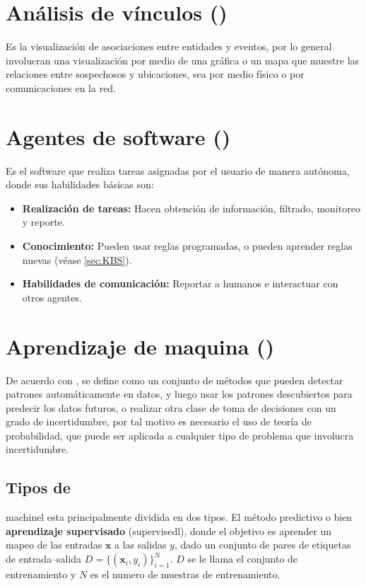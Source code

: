 
\section{Análisis de vínculos ()}
Es la visualización de asociaciones entre entidades y eventos, por lo general involucran una visualización por medio de una gráfica o un mapa que muestre las relaciones entre sospechosos y ubicaciones, sea por medio físico o por comunicaciones en la red.


\section{Agentes de software ()}
Es el software que realiza tareas asignadas por el usuario de manera autónoma, donde sus habilidades básicas son:
\begin{itemize}
\item \textbf{Realización de tareas:} Hacen obtención de información, filtrado, monitoreo y reporte.
\item \textbf{Conocimiento:} Pueden usar reglas programadas, o pueden aprender reglas nuevas (véase \ref{sec:KBS}).
\item \textbf{Habilidades de comunicación:} Reportar a humanos e interactuar con otros agentes.
\end{itemize}


\section{Aprendizaje de maquina ()} \label{sec:ML}
De acuerdo con \cite{murphymachinel}, se define como un conjunto de métodos que pueden detectar patrones automáticamente en datos, y luego usar los patrones descubiertos para predecir los datos futuros, o realizar otra clase de toma de decisiones con un grado de incertidumbre, por tal motivo es necesario el uso de teoría de probabilidad, que puede ser aplicada a cualquier tipo de problema que involucra incertidumbre.

\subsection{Tipos de }
\gls{machinel} esta principalmente dividida en dos tipos. El método predictivo o bien \textbf{aprendizaje supervisado} (\gls{supervisedl}), donde el objetivo es aprender un mapeo de las entradas $\mathbf{x}$ a las salidas $y$, dado un conjunto de pares de etiquetas de entrada--salida $D = \{(\mathbf{x}_i, y_i)\}_{i=1}^{N}$. $D$ se le llama el conjunto de entrenamiento y $N$ es el numero de muestras de entrenamiento.

